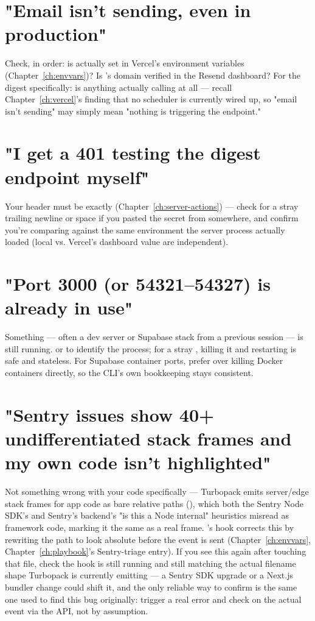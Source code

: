 \section*{"Email isn't sending, even in production"}
Check, in order: is  actually set in Vercel's environment variables (Chapter~\ref{ch:envvars})? Is 's domain verified in the Resend dashboard? For the digest specifically: is anything actually calling  at all — recall Chapter~\ref{ch:vercel}'s finding that no scheduler is currently wired up, so "email isn't sending" may simply mean "nothing is triggering the endpoint."

\section*{"I get a 401 testing the digest endpoint myself"}
Your  header must be exactly  (Chapter~\ref{ch:server-actions}) — check for a stray trailing newline or space if you pasted the secret from somewhere, and confirm you're comparing against the same environment the server process actually loaded (local  vs. Vercel's dashboard value are independent).

\section*{"Port 3000 (or 54321--54327) is already in use"}
Something — often a dev server or Supabase stack from a previous session — is still running.  or  to identify the process; for a stray , killing it and restarting is safe and stateless. For Supabase container ports, prefer  over killing Docker containers directly, so the CLI's own bookkeeping stays consistent.

\section*{"Sentry issues show 40+ undifferentiated stack frames and my own code isn't highlighted"}
Not something wrong with your code specifically — Turbopack emits server/edge stack frames for app code as bare relative paths (), which both the Sentry Node SDK's and Sentry's backend's "is this a Node internal" heuristics misread as framework code, marking it  the same as a real  frame. 's  hook corrects this by rewriting the path to look absolute before the event is sent (Chapter~\ref{ch:envvars}, Chapter~\ref{ch:playbook}'s Sentry-triage entry). If you see this again after touching that file, check the hook is still running and still matching the actual filename shape Turbopack is currently emitting — a Sentry SDK upgrade or a Next.js bundler change could shift it, and the only reliable way to confirm is the same one used to find this bug originally: trigger a real error and check  on the actual event via the API, not by assumption.

